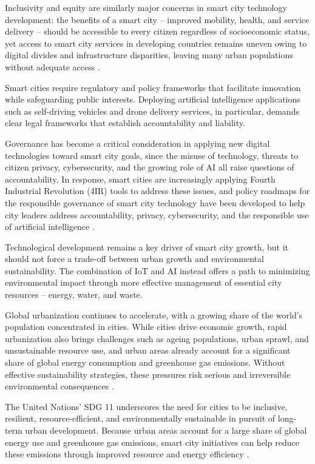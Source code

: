 \documentclass[journal]{IEEEtran}
\begin{document}
Inclusivity and equity are similarly major concerns in smart city technology development: the benefits of a smart city -- improved mobility, health, and service delivery -- should be accessible to every citizen regardless of socioeconomic status, yet access to smart city services in developing countries remains uneven owing to digital divides and infrastructure disparities, leaving many urban populations without adequate access \cite{r101}.

Smart cities require regulatory and policy frameworks that facilitate innovation while safeguarding public interests. Deploying artificial intelligence applications such as self-driving vehicles and drone delivery services, in particular, demands clear legal frameworks that establish accountability and liability.

Governance has become a critical consideration in applying new digital technologies toward smart city goals, since the misuse of technology, threats to citizen privacy, cybersecurity, and the growing role of AI all raise questions of accountability. In response, smart cities are increasingly applying Fourth Industrial Revolution (4IR) tools to address these issues, and policy roadmaps for the responsible governance of smart city technology have been developed to help city leaders address accountability, privacy, cybersecurity, and the responsible use of artificial intelligence \cite{r94,r117}.

Technological development remains a key driver of smart city growth, but it should not force a trade-off between urban growth and environmental sustainability. The combination of IoT and AI instead offers a path to minimizing environmental impact through more effective management of essential city resources -- energy, water, and waste.

Global urbanization continues to accelerate, with a growing share of the world's population concentrated in cities. While cities drive economic growth, rapid urbanization also brings challenges such as ageing populations, urban sprawl, and unsustainable resource use, and urban areas already account for a significant share of global energy consumption and greenhouse gas emissions. Without effective sustainability strategies, these pressures risk serious and irreversible environmental consequences \cite{r119}.

The United Nations' SDG 11 underscores the need for cities to be inclusive, resilient, resource-efficient, and environmentally sustainable in pursuit of long-term urban development. Because urban areas account for a large share of global energy use and greenhouse gas emissions, smart city initiatives can help reduce these emissions through improved resource and energy efficiency \cite{r85,r120}.
\end{document}
